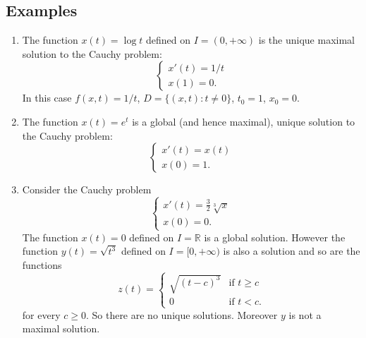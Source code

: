 \documentclass[12pt]{article}
\newcommand{\R}{\mathbb R}
\begin{document}
\subsection{Examples}
\begin{enumerate}
\item
The function $x(t)=\log t$ defined on $I=(0,+\infty)$ is the unique maximal solution to the Cauchy problem:
\[
\begin{cases}
x'(t) = 1/t\\
x(1)=0.
\end{cases}
\]
In this case $f(x,t)=1/t$, $D=\{(x,t)\colon t\neq 0\}$, $t_0=1$, $x_0=0$.

\item
The function $x(t)=e^t$ is a global (and hence maximal), unique solution to the Cauchy problem:
\[
\begin{cases}
x'(t) = x(t)\\
x(0)=1.
\end{cases}
\]

\item
Consider the Cauchy problem
\[
\begin{cases}
x'(t) = \frac 3 2 \sqrt[3] x\\
x(0)=0.
\end{cases}
\]
The function $x(t)=0$ defined on $I=\R$ is a global solution. 
However the function $y(t)=\sqrt{t^3}$ defined on $I=[0,+\infty)$ is also a  solution and so are the functions
\[
  z(t)=\begin{cases} \sqrt{(t-c)^3}&\text{if $t\ge c$} \\ 0 &\text{if $t < c$}.\end{cases}
\]
for every $c\ge 0$.
So there are no unique solutions. Moreover $y$ is not a maximal solution.

\end{enumerate}
\end{document}
